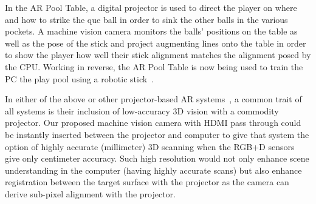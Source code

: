 \documentclass[]{spie}  %
\begin{document}
In the AR Pool Table, a digital projector is used to direct the player on where and how to strike the que ball in order to sink the other balls in the various pockets.  A machine vision camera monitors the balls' positions on the table as well as the pose of the stick and project augmenting lines onto the table in order to show the player how well their stick alignment matches the alignment posed by the CPU.  Working in reverse, the AR Pool Table is now being used to train the PC the play pool using a robotic stick~\cite{gree08}.

In either of the above or other projector-based AR systems~\cite{miya11, kemm16, dosh17}, a common trait of all systems is their inclusion of low-accuracy 3D vision with a commodity projector.  Our proposed machine vision camera with HDMI pass through could be instantly inserted between the projector and computer to give that system the option of highly accurate (millimeter) 3D scanning when the RGB+D sensors give only centimeter accuracy. Such high resolution would not only enhance scene understanding in the computer (having highly accurate scans) but also enhance registration between the target surface with the projector as the camera can derive sub-pixel alignment with the projector.
\end{document}
